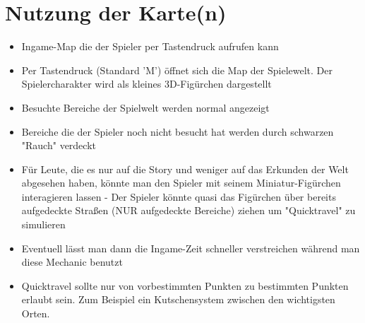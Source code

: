 \chapter{Nutzung der Karte(n)}
\begin{itemize}
	\item Ingame-Map die der Spieler per Tastendruck aufrufen kann
	\item Per Tastendruck (Standard 'M') öffnet sich die Map der Spielewelt. Der Spielercharakter wird als kleines 3D-Figürchen dargestellt
	\item Besuchte Bereiche der Spielwelt werden normal angezeigt
	\item Bereiche die der Spieler noch nicht besucht hat werden durch schwarzen "Rauch" verdeckt
	\item Für Leute, die es nur auf die Story und weniger auf das Erkunden der Welt abgesehen haben, könnte man den Spieler mit seinem Miniatur-Figürchen interagieren lassen - Der Spieler könnte quasi das Figürchen über bereits aufgedeckte Straßen (NUR aufgedeckte Bereiche) ziehen um "Quicktravel" zu simulieren
	\item Eventuell lässt man dann die Ingame-Zeit schneller verstreichen während man diese Mechanic benutzt
	\item Quicktravel sollte nur von vorbestimmten Punkten zu bestimmten Punkten erlaubt sein. Zum Beispiel ein Kutschensystem zwischen den wichtigsten Orten.
\end{itemize}